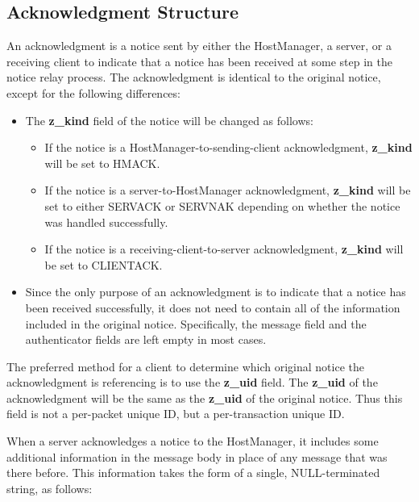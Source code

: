 %
\subsection{Acknowledgment Structure}
\label{acknowledgment-structure}

An acknowledgment is a notice sent by either the HostManager, a
server, or a receiving client to indicate that a notice has been
received at some step in the notice relay process.  The acknowledgment
is identical to the original notice, except for the following
differences:

\begin{itemize}
\item The {\bf z_kind} field of the notice will be changed as
follows:
\begin{itemize}
\item If the notice is a HostManager-to-sending-client acknowledgment,
{\bf z_kind} will be set to HMACK.
\item If the notice is a server-to-HostManager acknowledgment,
{\bf z_kind} will be set to either SERVACK or SERVNAK depending on
whether the notice was handled successfully.
\item If the notice is a receiving-client-to-server acknowledgment,
{\bf z_kind} will be set to CLIENTACK.
\end{itemize}
\item Since the only purpose of an acknowledgment is to indicate that a
notice has been received successfully, it does not need to contain all
of the information included in the original notice.  Specifically, the
message field and the authenticator fields are left empty in most cases.
\end{itemize}

The preferred method for a client to determine which original notice
the acknowledgment is referencing is to use the {\bf z_uid} field.
The {\bf z_uid} of the acknowledgment will be the same as the {\bf
z_uid} of the original notice.  Thus this field is not a per-packet
unique ID, but a per-transaction unique ID.

When a server acknowledges a notice to the HostManager, it includes
some additional information in the message body in place of any
message that was there before.  This information takes the form of a
single, NULL-terminated string, as follows:

